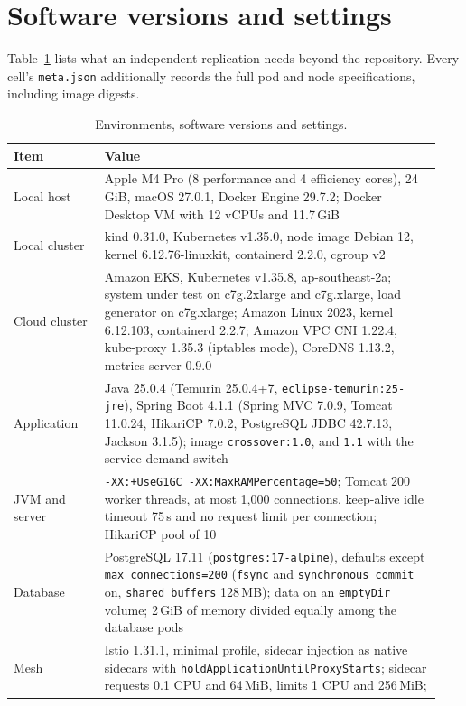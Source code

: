 \appendix
\section{Software versions and settings}
\label{sec:appendix}

Table~\ref{tab:repro} lists what an independent replication needs beyond the repository. Every cell's
\texttt{meta.json} additionally records the full pod and node specifications, including image digests.

\begin{table}[ht]
\caption{Environments, software versions and settings.}
\label{tab:repro}
\centering\footnotesize
\begin{tabular}{@{}>{\raggedright\arraybackslash}p{0.2\linewidth}>{\raggedright\arraybackslash}p{0.74\linewidth}@{}}
\toprule
Item & Value \\
\midrule
Local host & Apple M4 Pro (8 performance and 4 efficiency cores), 24\,GiB, macOS 27.0.1, Docker Engine 29.7.2;
  Docker Desktop VM with 12 vCPUs and 11.7\,GiB \\
Local cluster & kind 0.31.0, Kubernetes v1.35.0, node image Debian 12, kernel 6.12.76-linuxkit, containerd 2.2.0,
  cgroup v2 \\
Cloud cluster & Amazon EKS, Kubernetes v1.35.8, ap-southeast-2a; system under test on c7g.2xlarge and c7g.xlarge,
  load generator on c7g.xlarge; Amazon Linux 2023, kernel 6.12.103, containerd 2.2.7; Amazon VPC CNI 1.22.4,
  kube-proxy 1.35.3 (iptables mode), CoreDNS 1.13.2, metrics-server 0.9.0 \\
Application & Java 25.0.4 (Temurin 25.0.4+7, \texttt{eclipse-temurin:25-jre}), Spring Boot 4.1.1 (Spring MVC
  7.0.9, Tomcat 11.0.24, HikariCP 7.0.2, PostgreSQL JDBC 42.7.13, Jackson 3.1.5); image \texttt{crossover:1.0},
  and \texttt{1.1} with the service-demand switch \\
JVM and server & \texttt{-XX:+UseG1GC -XX:MaxRAMPercentage=50}; Tomcat 200 worker threads, at most 1{,}000
  connections, keep-alive idle timeout 75\,s and no request limit per connection; HikariCP pool of 10 \\
Database & PostgreSQL 17.11 (\texttt{postgres:17-alpine}), defaults except \texttt{max\_connections=200}
  (\texttt{fsync} and \texttt{synchronous\_commit} on, \texttt{shared\_buffers} 128\,MB); data on an
  \texttt{emptyDir} volume; 2\,GiB of memory divided equally among the database pods \\
Mesh & Istio 1.31.1, minimal profile, sidecar injection as native sidecars with
  \texttt{holdApplicationUntilProxyStarts}; sidecar requests 0.1 CPU and 64\,MiB, limits 1 CPU and 256\,MiB;

\end{tabular}
\end{table}
